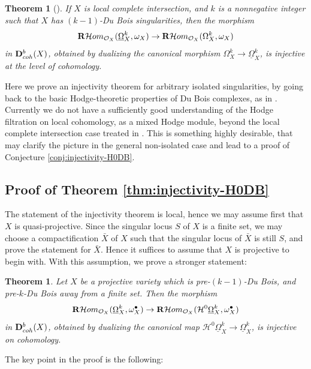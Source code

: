 \documentclass[11pt]{amsart}
\newtheorem{theorem}[equation]{Theorem}
\theoremstyle{definition}
\theoremstyle{plain}
\renewcommand{\H}{\mathcal H}
\renewcommand{\O}{\mathcal O}
\newcommand{\DD}{\mathbf D}
\newcommand{\RHom}{{\bf R} \H om}
\newcommand{\DB}{\underline{\Omega}} %
\begin{document}
\begin{theorem}[{\cite[Theorem A]{MP-lci}}]\label{thm:MP-injectivity}
If $X$ is local complete intersection, and $k$ is a nonnegative integer such that $X$ has $(k - 1)$-Du Bois singularities, then the morphism
\[\RHom_{\O_X} (\DB_X^k,\omega_X)\to \RHom_{\O_X} (\Omega_X^k,\omega_X)\]
in $\DD^b_{\rm coh} (X)$, obtained by dualizing the canonical
morphism $\Omega_X^k \to\DB_X^k$, is injective at the level of cohomology.
\end{theorem}

Here we prove an injectivity theorem for arbitrary isolated singularities, by going back to the basic Hodge-theoretic properties of Du Bois complexes, as in \cite{KS-injectivity}. Currently we do not have a sufficiently good understanding of the Hodge filtration on local cohomology, 
as a mixed Hodge module, beyond the local complete intersection case treated in \cite{MP-LC}. This is something highly desirable, that may clarify
the picture in the general non-isolated case and lead to a proof of Conjecture \ref{conj:injectivity-H0DB}.


\subsection{Proof of Theorem \ref{thm:injectivity-H0DB}}\label{scn:inj}
The statement of the injectivity theorem is local, hence we may assume first that $X$ is quasi-projective. Since the singular locus $S$ of $X$ is 
a finite set, we may choose a compactification $\bar{X}$  of $X$ such that the singular locus of $\bar{X}$ is still $S$, and prove the statement for $\bar{X}$.
Hence it suffices to assume that $X$ is projective to begin with. With this assumption, we prove a stronger statement:

\begin{theorem}\label{thm:injectivity-H0DB-gen}
    Let $X$ be a projective variety which is pre-$(k-1)$-Du Bois, and pre-$k$-Du Bois away from a finite set. Then the morphism
    \[\RHom_{\O_X}(\DB_X^k,\omega_X^{\bullet})\to \RHom_{\O_X}(\H^0\DB_X^k,\omega_X^{\bullet})\]
    in $\DD^b_{\rm coh} (X)$, obtained by dualizing the canonical map $\H^0\DB_X^k \to \DB_X^k$,
    is injective on cohomology. 
\end{theorem}

The key point in the proof is the following:
\end{document}
